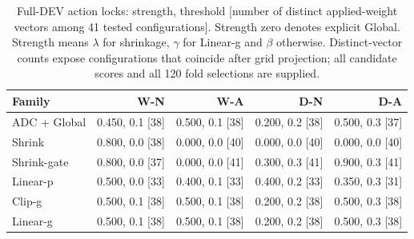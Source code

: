 \begin{table}[htbp]
\centering\footnotesize
\setlength{\tabcolsep}{4pt}
\caption{Full-DEV action locks: strength, threshold [number of distinct applied-weight vectors among 41 tested configurations]. Strength zero denotes explicit Global. Strength means $\lambda$ for shrinkage, $\gamma$ for Linear-g and $\beta$ otherwise. Distinct-vector counts expose configurations that coincide after grid projection; all candidate scores and all 120 fold selections are supplied.}
\label{tab:matched-locks}
\begin{tabular}{lrrrr}
\toprule
Family & W-N & W-A & D-N & D-A\\
\midrule
ADC + Global & 0.450, 0.1 [38] & 0.500, 0.1 [38] & 0.200, 0.2 [38] & 0.500, 0.3 [37]\\
Shrink & 0.800, 0.0 [38] & 0.000, 0.0 [40] & 0.000, 0.0 [40] & 0.000, 0.0 [40]\\
Shrink-gate & 0.800, 0.0 [37] & 0.000, 0.0 [41] & 0.300, 0.3 [41] & 0.900, 0.3 [41]\\
Linear-p & 0.500, 0.0 [33] & 0.400, 0.1 [33] & 0.400, 0.2 [33] & 0.350, 0.3 [31]\\
Clip-g & 0.500, 0.1 [38] & 0.500, 0.1 [38] & 0.200, 0.2 [38] & 0.500, 0.3 [38]\\
Linear-g & 0.500, 0.1 [38] & 0.500, 0.1 [38] & 0.200, 0.2 [38] & 0.500, 0.3 [38]\\
\bottomrule
\end{tabular}
\end{table}
